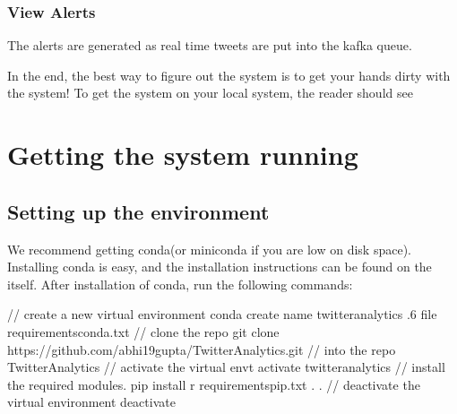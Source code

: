\documentclass[letterpaper,10pt,english]{sphinxmanual}
\begin{document}
\noindent{}


\subsection{View Alerts}
\label{\detokenize{dashboard_website:view-alerts}}
The alerts are generated as real time tweets are put into the kafka queue.

\noindent{}

In the end, the best way to figure out the system is to get your hands dirty with the system! To get the system on your local system, the reader should see {\hyperref[\detokenize{running:getting-the-system-running}]{}}


\chapter{Getting the system running}
\label{\detokenize{running:getting-the-system-running}}\label{\detokenize{running::doc}}

\section{Setting up the environment}
\label{\detokenize{running:setting-up-the-environment}}
We recommend getting conda(or miniconda if you are low on disk space). Installing conda is easy, and the installation instructions can be found on the  itself. After installation of conda, run the following commands:

\begin{sphinxVerbatim}[commandchars=\\\{\}]
// create a new virtual environment
conda create \PYGZhy{}\PYGZhy{}name twitter\PYGZus{}analytics .6 \PYGZhy{}\PYGZhy{}file requirements\PYGZus{}conda.txt
// clone the repo
git clone https://github.com/abhi19gupta/TwitterAnalytics.git
//  into the repo
 TwitterAnalytics
// activate the virtual envt
 activate twitter\PYGZus{}analytics
// install the required modules.
pip install \PYGZhy{}r requirements\PYGZus{}pip.txt
.
.
// deactivate the virtual environment
 deactivate
\end{sphinxVerbatim}
\end{document}
